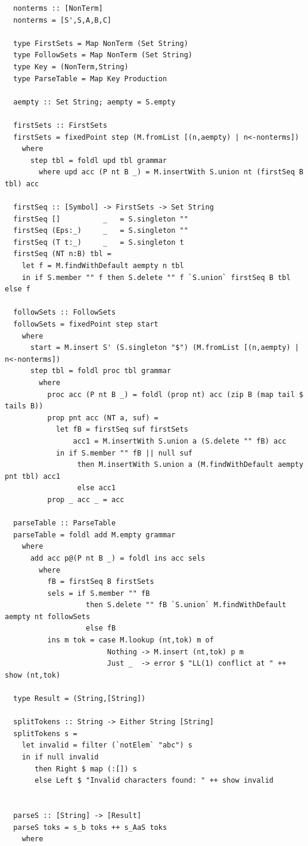 \documentclass[areasetadvanced]{scrartcl}
\begin{document}
\begin{lstlisting}
  nonterms :: [NonTerm]
  nonterms = [S',S,A,B,C]
  
  type FirstSets = Map NonTerm (Set String)
  type FollowSets = Map NonTerm (Set String)
  type Key = (NonTerm,String)
  type ParseTable = Map Key Production
  
  aempty :: Set String; aempty = S.empty
  
  firstSets :: FirstSets
  firstSets = fixedPoint step (M.fromList [(n,aempty) | n<-nonterms])
    where
      step tbl = foldl upd tbl grammar
        where upd acc (P nt B _) = M.insertWith S.union nt (firstSeq B tbl) acc
  
  firstSeq :: [Symbol] -> FirstSets -> Set String
  firstSeq []          _   = S.singleton ""
  firstSeq (Eps:_)     _   = S.singleton ""
  firstSeq (T t:_)     _   = S.singleton t
  firstSeq (NT n:B) tbl =
    let f = M.findWithDefault aempty n tbl
    in if S.member "" f then S.delete "" f `S.union` firstSeq B tbl else f
  
  followSets :: FollowSets
  followSets = fixedPoint step start
    where
      start = M.insert S' (S.singleton "$") (M.fromList [(n,aempty) | n<-nonterms])
      step tbl = foldl proc tbl grammar
        where
          proc acc (P nt B _) = foldl (prop nt) acc (zip B (map tail $ tails B))
          prop pnt acc (NT a, suf) =
            let fB = firstSeq suf firstSets
                acc1 = M.insertWith S.union a (S.delete "" fB) acc
            in if S.member "" fB || null suf
                 then M.insertWith S.union a (M.findWithDefault aempty pnt tbl) acc1
                 else acc1
          prop _ acc _ = acc
  
  parseTable :: ParseTable
  parseTable = foldl add M.empty grammar
    where
      add acc p@(P nt B _) = foldl ins acc sels
        where
          fB = firstSeq B firstSets
          sels = if S.member "" fB
                   then S.delete "" fB `S.union` M.findWithDefault aempty nt followSets
                   else fB
          ins m tok = case M.lookup (nt,tok) m of
                        Nothing -> M.insert (nt,tok) p m
                        Just _  -> error $ "LL(1) conflict at " ++ show (nt,tok)
  
  type Result = (String,[String])
  
  splitTokens :: String -> Either String [String]
  splitTokens s = 
    let invalid = filter (`notElem` "abc") s
    in if null invalid 
       then Right $ map (:[]) s
       else Left $ "Invalid characters found: " ++ show invalid
  
  
  parseS :: [String] -> [Result]
  parseS toks = s_b toks ++ s_AaS toks
    where


\end{lstlisting}
\end{document}
